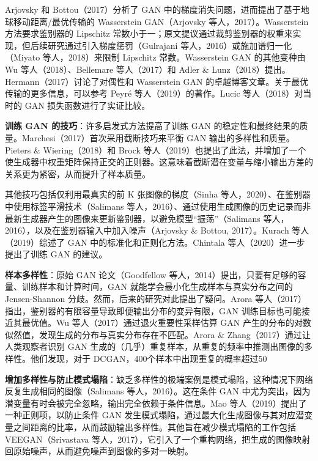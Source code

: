 Arjovsky 和 Bottou（2017）分析了 GAN 中的梯度消失问题，进而提出了基于地球移动距离/最优传输的 Wasserstein GAN（Arjovsky 等人，2017）。Wasserstein 方法要求鉴别器的 Lipschitz 常数小于一；原文提议通过裁剪鉴别器的权重来实现，但后续研究通过引入梯度惩罚（Gulrajani 等人，2016）或施加谱归一化（Miyato 等人，2018）来限制 Lipschitz 常数。Wasserstein GAN 的其他变种由 Wu 等人（2018）、Bellemare 等人（2017）和 Adler \& Lunz（2018）提出。Hermann（2017）讨论了对偶性和 Wasserstein GAN 的卓越博客文章。关于最优传输的更多信息，可以参考 Peyré 等人（2019）的著作。Lucic 等人（2018）对当时的 GAN 损失函数进行了实证比较。

\textbf{训练 GAN 的技巧}：许多启发式方法提高了训练 GAN 的稳定性和最终结果的质量。Marchesi（2017）首次采用截断技巧来平衡 GAN 输出的多样性和质量。Pieters \& Wiering（2018）和 Brock 等人（2019）也提出了此法，并增加了一个使生成器中权重矩阵保持正交的正则器。这意味着截断潜在变量与缩小输出方差的关系更为紧密，从而提升了样本质量。

其他技巧包括仅利用最真实的前 K 张图像的梯度（Sinha 等人，2020）、在鉴别器中使用标签平滑技术（Salimans 等人，2016）、通过使用生成图像的历史记录而非最新生成器产生的图像来更新鉴别器，以避免模型“振荡”（Salimans 等人，2016），以及在鉴别器输入中加入噪声（Arjovsky \& Bottou, 2017）。Kurach 等人（2019）综述了 GAN 中的标准化和正则化方法。Chintala 等人（2020）进一步提出了训练 GAN 的建议。

\textbf{样本多样性}：原始 GAN 论文（Goodfellow 等人，2014）提出，只要有足够的容量、训练样本和计算时间，GAN 就能学会最小化生成样本与真实分布之间的 Jensen-Shannon 分歧。然而，后来的研究对此提出了疑问。Arora 等人（2017）指出，鉴别器的有限容量导致即便输出分布的变异有限，GAN 训练目标也可能接近其最优值。Wu 等人（2017）通过退火重要性采样估算 GAN 产生的分布的对数似然值，发现生成的分布与真实分布存在不匹配。Arora \& Zhang（2017）通过让人类观察者识别 GAN 生成的（几乎）重复样本，从重复的频率中推测出图像的多样性。他们发现，对于 DCGAN，400个样本中出现重复的概率超过50%

\textbf{增加多样性与防止模式塌陷}：缺乏多样性的极端案例是模式塌陷，这种情况下网络反复生成相同的图像（Salimans 等人，2016）。这在条件 GAN 中尤为突出，因为潜变量有时会被完全忽略，输出完全依赖于条件信息。Mao 等人（2019）提出了一种正则项，以防止条件 GAN 发生模式塌陷，通过最大化生成图像与其对应潜变量之间距离的比率，从而鼓励输出多样性。其他旨在减少模式塌陷的工作包括 VEEGAN（Srivastava 等人，2017），它引入了一个重构网络，把生成的图像映射回原始噪声，从而避免噪声到图像的多对一映射。

